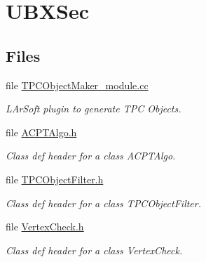 \hypertarget{group__UBXSec}{\section{U\-B\-X\-Sec}
\label{group__UBXSec}
}
\subsection*{Files}
\begin{DoxyCompactItemize}
\item 
file \hyperlink{TPCObjectMaker__module_8cc}{T\-P\-C\-Object\-Maker\-\_\-module.\-cc}
\begin{DoxyCompactList}\small\item\em L\-Ar\-Soft plugin to generate T\-P\-C Objects. \end{DoxyCompactList}\item 
file \hyperlink{ACPTAlgo_8h}{A\-C\-P\-T\-Algo.\-h}
\begin{DoxyCompactList}\small\item\em Class def header for a class A\-C\-P\-T\-Algo. \end{DoxyCompactList}\item 
file \hyperlink{TPCObjectFilter_8h}{T\-P\-C\-Object\-Filter.\-h}
\begin{DoxyCompactList}\small\item\em Class def header for a class T\-P\-C\-Object\-Filter. \end{DoxyCompactList}\item 
file \hyperlink{VertexCheck_8h}{Vertex\-Check.\-h}
\begin{DoxyCompactList}\small\item\em Class def header for a class Vertex\-Check. \end{DoxyCompactList}\end{DoxyCompactItemize}
